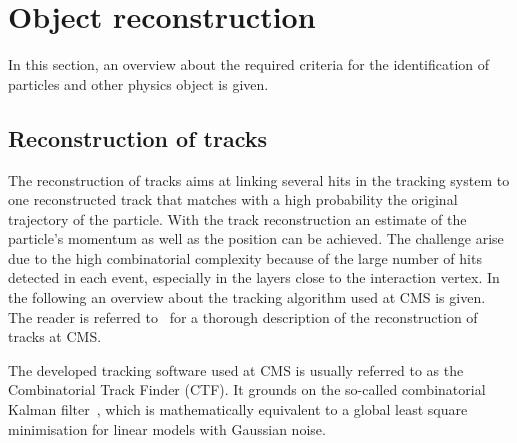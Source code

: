 \section{Object reconstruction}
\label{sec:ObjectReconstruction}
In this section, an overview about the required criteria for the identification of particles and other physics object is given.
\subsection{Reconstruction of tracks}
The reconstruction of tracks aims at linking several hits in the tracking system to one reconstructed track that matches with a high probability the original trajectory of the particle.
With the track reconstruction an estimate of the particle's momentum as well as the position can be achieved.
The challenge arise due to the high combinatorial complexity because of the large number of hits detected in each event, especially in the layers close to the interaction vertex.
In the following an overview about the tracking algorithm used at CMS is given.
The reader is referred to~\cite{bib:CMS:tracking_8TeV} for a thorough description of the reconstruction of tracks at CMS.

The developed tracking software used at CMS is usually referred to as the Combinatorial Track Finder (CTF).
It grounds on the so-called combinatorial Kalman filter~\cite{bib:TrackAlgorithm_1989,bib:TrackAlgorithm_1990,bib:TrackAlgorithm_1997}, which is mathematically equivalent to a global least square minimisation for linear models with Gaussian noise.

